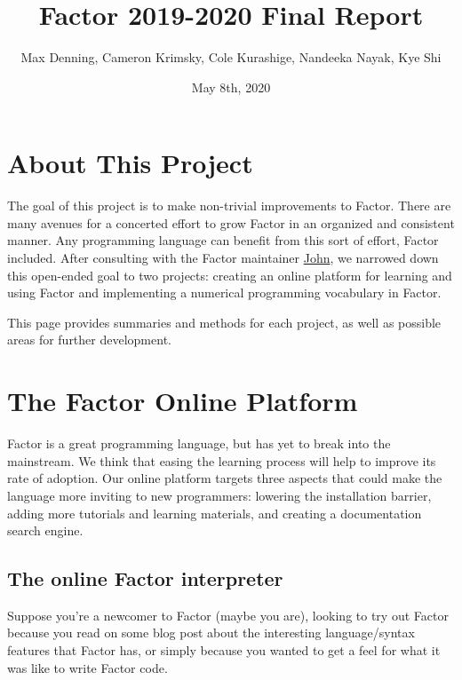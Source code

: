 \documentclass[
]{article}
\title{Factor 2019-2020 Final Report}
\author{Max Denning, Cameron Krimsky, Cole Kurashige, Nandeeka Nayak, Kye Shi}
\date{May 8th, 2020}
\begin{document}
\maketitle

\hypertarget{about-this-project}{%
\section{About This Project}\label{about-this-project}}

The goal of this project is to make non-trivial improvements to Factor.
There are many avenues for a concerted effort to grow Factor in an
organized and consistent manner. Any programming language can benefit
from this sort of effort, Factor included. After consulting with the
Factor maintainer \href{https://re-factor.blogspot.com/}{John}, we
narrowed down this open-ended goal to two projects: creating an online
platform for learning and using Factor and implementing a numerical
programming vocabulary in Factor.

This page provides summaries and methods for each project, as well as
possible areas for further development.

\hypertarget{the-factor-online-platform}{%
\section{The Factor Online Platform}\label{the-factor-online-platform}}

Factor is a great programming language, but has yet to break into the
mainstream. We think that easing the learning process will help to
improve its rate of adoption. Our online platform targets three aspects
that could make the language more inviting to new programmers: lowering
the installation barrier, adding more tutorials and learning materials,
and creating a documentation search engine.

\hypertarget{the-online-factor-interpreter}{%
\subsection{The online Factor
interpreter}\label{the-online-factor-interpreter}}

Suppose you're a newcomer to Factor (maybe you are), looking to try out
Factor because you read on some blog post about the interesting
language/syntax features that Factor has, or simply because you wanted
to get a feel for what it was like to write Factor code.
\end{document}
